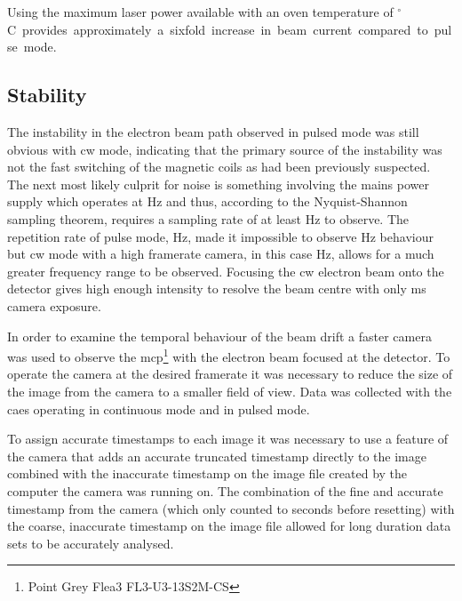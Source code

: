 Using the maximum laser power available with an oven temperature of \unit[200]{$^\circ$C} provides approximately a sixfold increase in beam current compared to pulse mode.

\subsection{Stability}\label{section:stability}

The instability in the electron beam path observed in pulsed mode was still obvious with \gls{cw} mode, indicating that the primary source of the instability was not the fast switching of the magnetic coils as had been previously suspected.
The next most likely culprit for noise is something involving the mains power supply which operates at \unit[50]{Hz} and thus, according to the Nyquist-Shannon sampling theorem, requires a sampling rate of at least \unit[100]{Hz} to observe.
The repetition rate of pulse mode, \unit[10]{Hz}, made it impossible to observe \unit[50]{Hz} behaviour but \gls{cw} mode with a high framerate camera, in this case \unit[240]{Hz}, allows for a much greater frequency range to be observed.
Focusing the \gls{cw} electron beam onto the detector gives high enough intensity to resolve the beam centre with only \unit[4]{ms} camera exposure.

In order to examine the temporal behaviour of the beam drift a faster camera was used to observe the \gls{mcp}\footnote{Point Grey Flea3 FL3-U3-13S2M-CS} with the electron beam focused at the detector.
To operate the camera at the desired framerate it was necessary to reduce the size of the image from the camera to a smaller field of view.
Data was collected with the \gls{caes} operating in continuous mode and in pulsed mode.

To assign accurate timestamps to each image it was necessary to use a feature of the camera that adds an accurate truncated timestamp directly to the image combined with the inaccurate timestamp on the image file created by the computer the camera was running on.
The combination of the fine and accurate timestamp from the camera (which only counted to \unit[128]{seconds} before resetting) with the coarse, inaccurate timestamp on the image file allowed for long duration data sets to be accurately analysed.

